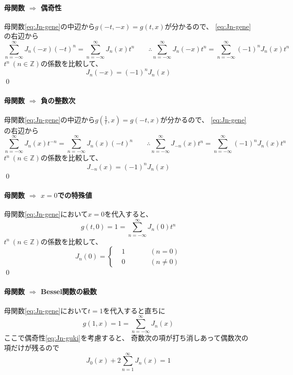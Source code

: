 \documentclass[../main/main]{subfiles}
\begin{document}
\paragraph{母関数 $\Longrightarrow$  偶奇性}
母関数\eqref{eq:Jn-gene}の中辺から$g(-t, -x) = g(t, x)$が分かるので、
\eqref{eq:Jn-gene}の右辺から
\begin{equation*}
  \sum_{n=-\infty}^\infty J_n(-x) (-t)^n = \sum_{n=-\infty}^\infty J_n(x) t^n \qquad \therefore
  \sum_{n=-\infty}^\infty J_n(-x) t^n = \sum_{n=-\infty}^\infty (-1)^n J_n(x) t^n
\end{equation*}
$t^n \ (n\in \mathbb{Z})$の係数を比較して、
\begin{equation*}
  J_n(-x) = (-1)^n J_n(x)
\end{equation*}\qed

\paragraph{母関数 $\Longrightarrow$ 負の整数次}
母関数\eqref{eq:Jn-gene}の中辺から$g(\frac{1}{t}, x) = g(-t, x)$が分かるので、
\eqref{eq:Jn-gene}の右辺から
\begin{equation*}
  \sum_{n=-\infty}^\infty J_n(x) t^{-n} = \sum_{n=-\infty}^\infty J_n(x) (-t)^n \qquad \therefore
  \sum_{n=-\infty}^\infty J_{-n}(x) t^{n} = \sum_{n=-\infty}^\infty (-1)^n J_n(x) t^n
\end{equation*}
$t^n \ (n\in \mathbb{Z})$の係数を比較して、
\begin{equation*}
  J_{-n}(x) = (-1)^n J_n(x)
\end{equation*}\qed


\paragraph{母関数 $\Longrightarrow$ $x=0$での特殊値}
母関数\eqref{eq:Jn-gene}において$x=0$を代入すると、
\begin{equation*}
  g(t, 0) = 1
	= \sum_{n=-\infty}^\infty J_n(0) t^n
\end{equation*}
$t^n \ (n\in \mathbb{Z})$の係数を比較して、
\begin{equation*}
  J_n(0) = 
  \left\{ 
  \begin{alignedat}{2}
    &1 &\qquad	& (n=0) \\
    &0 &			& (n\neq 0)
  \end{alignedat}
  \right.
\end{equation*}\qed

\paragraph{母関数 $\Longrightarrow$ Bessel関数の級数}
母関数\eqref{eq:Jn-gene}において$t=1$を代入すると直ちに
\begin{equation*}
  g(1, x) = 1
	= \sum_{n=-\infty}^\infty J_n(x) 
\end{equation*}
ここで偶奇性\eqref{eq:Jn-guki}を考慮すると、
奇数次の項が打ち消しあって偶数次の項だけが残るので
\begin{equation*}
  J_0(x) + 2 \sum_{n=1}^\infty J_n(x) = 1
\end{equation*}
\end{document}

